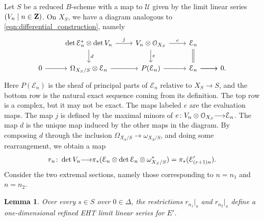 \documentclass[11pt,reqno]{amsart}
\theoremstyle{plain}
\newtheorem{lemma}[theorem]{Lemma}
\theoremstyle{definition}
\theoremstyle{remark}
\numberwithin{equation}{section}
\renewcommand{\to}{{\longrightarrow}}
\numberwithin{equation}{section}
\renewcommand{\O}{\mathcal O}
\begin{document}
Let $S$ be a reduced $B$-scheme with a map to $\mathcal U$ given by the limit linear series $(V_n \mid n \in {\bf Z})$.
On $X_S$, we have a diagram analogous to \eqref{eqn:differential_construction}, namely
\begin{equation}
  \label{eq:llspr}
  \begin{tikzcd}
    &\det \mathcal E_n^* \otimes \det V_n\ar{r}{j}\ar{d}{d} & V_n \otimes \O_{X_S}\ar{r}{e}\ar{d}{e} & \mathcal E_n\ar[equal]{d}&\\
    0\ar{r} & \Omega_{X_S/S} \otimes \mathcal E_n\ar{r} & P(\mathcal E_n)\ar{r} &\ar{r} \mathcal E_n \ar{r}& 0.
  \end{tikzcd}
\end{equation}
Here $P(\mathcal E_n)$ is the sheaf of principal parts of $\mathcal E_n$ relative to $X_S \to S$, and the bottom row is the natural exact sequence coming from its definition.
The top row is a complex, but it may not be exact.
The maps labeled $e$ are the evaluation maps.
The map $j$ is defined by the maximal minors of $e \from V_n \otimes \O_{X_S} \to \mathcal E_n$.
The map $d$ is the unique map induced by the other maps in the diagram.
By composing $d$ through the inclusion $\Omega_{X_S/S} \to \omega_{X_S/S}$, and doing some rearrangement, we obtain a map
\begin{equation}\label{eqn:Rn}
r_n \from \det V_n \to \mathcal \pi_*(\mathcal E_n \otimes \det \mathcal E_n \otimes \omega^*_{X_S/S}) = \pi_*(\mathcal E'_{(r+1)n}).
\end{equation}
Consider the two extremal sections, namely those corresponding to $n = n_1$ and $n = n_2$.
\begin{lemma}\label{lem:rameht}
  Over every $s \in S$ over $0 \in \Delta$, the restrictions $r_{n_1}|_s$ and $r_{n_2}|_s$ define a one-dimensional refined EHT limit linear series for $E'$.
\end{lemma}
\end{document}

